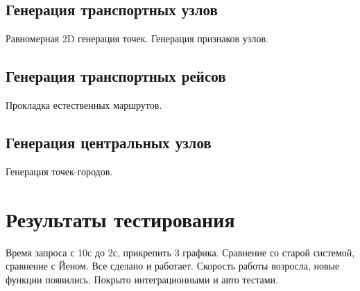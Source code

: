 \subsection{Генерация транспортных узлов}
Равномерная 2D генерация точек. Генерация признаков узлов. 
\subsection{Генерация транспортных рейсов}
Прокладка естественных маршрутов.
\subsection{Генерация центральных узлов}
Генерация точек-городов.
\section{Результаты тестирования}
Время запроса с 10с до 2с, прикрепить 3 графика. Сравнение со старой системой, сравнение с Йеном.
\chapterconclusion
Все сделано и работает. Скорость работы возросла, новые функции появились. Покрыто интеграционными и авто тестами.
